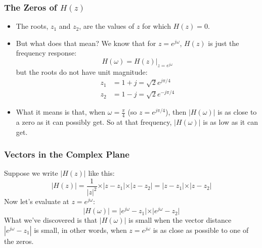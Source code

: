 \documentclass{beamer}
\begin{document}
\begin{frame}
  \frametitle{The Zeros of $H(z)$}

  \begin{itemize}
  \item The roots, $z_1$ and $z_2$, are the values of $z$ for which
    $H(z)=0$.
  \item But what does that mean?  We know that for $z=e^{j\omega}$,
    $H(z)$ is just the frequency response:
    \[
    H(\omega) = H(z)\vert_{z=e^{j\omega}}
    \]
    but the roots do not have unit magnitude:
    \begin{align*}
      z_1 &= 1+j =\sqrt{2}e^{j\pi/4}\\
      z_2 &= 1-j = \sqrt{2}e^{-j\pi/4}
    \end{align*}
  \item What it means is that, when $\omega=\frac{\pi}{4}$ (so
    $z=e^{j\pi/4}$), then $|H(\omega)|$ is as close to a zero as it
    can possibly get.  So at that frequency, $|H(\omega)|$ is as low
    as it can get.
  \end{itemize}
\end{frame}

\begin{frame}
  \centerline{}
\end{frame}

\begin{frame}
  \centerline{}
\end{frame}

\begin{frame}
  \frametitle{Vectors in the Complex Plane}

  Suppose we write $|H(z)|$ like this:
  \[
  \vert H(z)\vert = \frac{1}{|z|^2}\times\vert z-z_1\vert\times\vert z-z_2\vert
  = \vert z-z_1\vert\times\vert z-z_2\vert
  \]
  Now let's evaluate at $z=e^{j\omega}$:
  \[
  \vert H(\omega)\vert = 
  \vert e^{j\omega} -z_1\vert\times\vert e^{j\omega}-z_2\vert
  \]
  What we've discovered is that $|H(\omega)|$ is small when the vector
  distance $|e^{j\omega}-z_1|$ is small, in other words, when
  $z=e^{j\omega}$ is as close as possible to one of the zeros.
\end{frame}

\begin{frame}
  \centerline{}
\end{frame}
\end{document}
